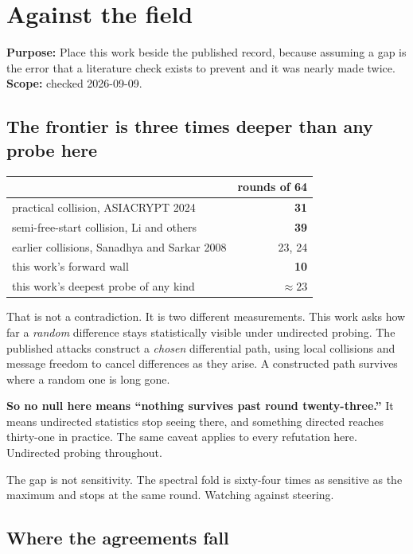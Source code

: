 \chapter{Against the field}

\textbf{Purpose:} Place this work beside the published record, because assuming a gap is the error that a literature check exists to prevent and it was nearly made twice. \textbf{Scope:} checked 2026-09-09.

\section{The frontier is three times deeper than any probe here}

\begin{center}
\begin{tabular}{lr}
\toprule
 & rounds of 64 \\
\midrule
practical collision, ASIACRYPT 2024 & \textbf{31} \\
semi-free-start collision, Li and others & \textbf{39} \\
earlier collisions, Sanadhya and Sarkar 2008 & 23, 24 \\
this work's forward wall & \textbf{10} \\
this work's deepest probe of any kind & \(\approx 23\) \\
\bottomrule
\end{tabular}
\end{center}

That is not a contradiction. It is two different measurements. This work asks how far a \emph{random} difference stays statistically visible under undirected probing. The published attacks construct a \emph{chosen} differential path, using local collisions and message freedom to cancel differences as they arise. A constructed path survives where a random one is long gone.

\textbf{So no null here means ``nothing survives past round twenty-three.''} It means undirected statistics stop seeing there, and something directed reaches thirty-one in practice. The same caveat applies to every refutation here. Undirected probing throughout.

The gap is not sensitivity. The spectral fold is sixty-four times as sensitive as the maximum and stops at the same round. Watching against steering.

\section{Where the agreements fall}

